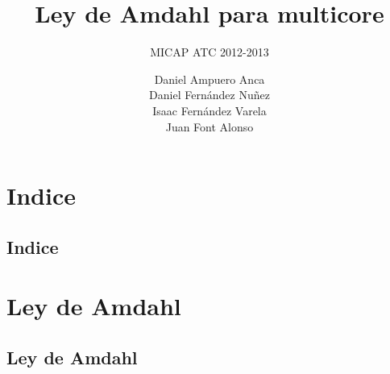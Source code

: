 \documentclass[utf8]{beamer}
\title{Ley de Amdahl para multicore}
\subtitle{MICAP ATC 2012-2013}
\author[]{Daniel Ampuero Anca \\ Daniel Fernández Nuñez \\ Isaac Fernández Varela \\ Juan Font Alonso}
\date[7 de enero de 2012] %
\begin{document}
\renewcommand{\figurename}{Figura} 


\begin{frame}
    \maketitle
\end{frame}

\section*{Indice}
\subsection*{Indice}
\begin{frame}
    \tableofcontents
\end{frame}

\section{Ley de Amdahl}

\subsection*{Ley de Amdahl}
\end{document}
